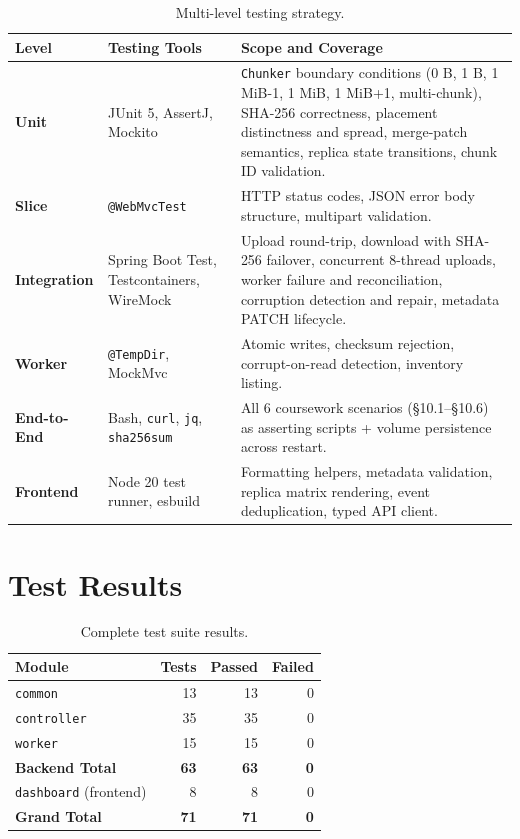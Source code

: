 \documentclass[12pt,a4paper]{report}
\begin{document}
\begin{table}[H]
  \centering
  \caption{Multi-level testing strategy.}
  \label{tab:testing}
  \begin{tabularx}{\textwidth}{>{\bfseries}l p{4.2cm} X}
    \toprule
    \textbf{Level} & \textbf{Testing Tools} & \textbf{Scope and Coverage} \\
    \midrule
    Unit            & JUnit 5, AssertJ, Mockito  & \texttt{Chunker} boundary conditions (0 B, 1 B, 1 MiB-1, 1 MiB, 1 MiB+1, multi-chunk), SHA-256 correctness, placement distinctness and spread, merge-patch semantics, replica state transitions, chunk ID validation. \\
    Slice           & \texttt{@WebMvcTest}       & HTTP status codes, JSON error body structure, multipart validation. \\
    Integration     & Spring Boot Test, Testcontainers, WireMock & Upload round-trip, download with SHA-256 failover, concurrent 8-thread uploads, worker failure and reconciliation, corruption detection and repair, metadata PATCH lifecycle. \\
    Worker          & \texttt{@TempDir}, MockMvc & Atomic writes, checksum rejection, corrupt-on-read detection, inventory listing. \\
    End-to-End      & Bash, \texttt{curl}, \texttt{jq}, \texttt{sha256sum} & All 6 coursework scenarios (\S10.1--\S10.6) as asserting scripts + volume persistence across restart. \\
    Frontend        & Node 20 test runner, esbuild & Formatting helpers, metadata validation, replica matrix rendering, event deduplication, typed API client. \\
    \bottomrule
  \end{tabularx}
\end{table}

\section{Test Results}

\begin{table}[H]
  \centering
  \caption{Complete test suite results.}
  \label{tab:test-results}
  \begin{tabular}{lrrr}
    \toprule
    \textbf{Module} & \textbf{Tests} & \textbf{Passed} & \textbf{Failed} \\
    \midrule
    \texttt{common}      & 13 & 13 & 0 \\
    \texttt{controller}  & 35 & 35 & 0 \\
    \texttt{worker}      & 15 & 15 & 0 \\
    \midrule
    \textbf{Backend Total} & \textbf{63} & \textbf{63} & \textbf{0} \\
    \midrule
    \texttt{dashboard} (frontend) & 8 & 8 & 0 \\
    \midrule
    \textbf{Grand Total} & \textbf{71} & \textbf{71} & \textbf{0} \\
    \bottomrule
  \end{tabular}
\end{table}
\end{document}
